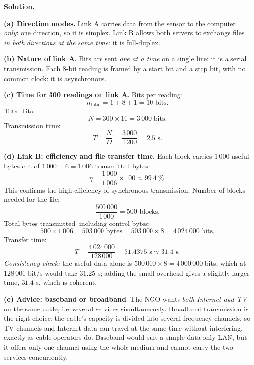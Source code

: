 \documentclass[11pt]{article}
\newcommand{\cle}[1]{{\popxbold\color{popdark}#1}}
\begin{document}
\begin{exoresolu}
\textbf{Solution.}

\textbf{(a) Direction modes.} Link A carries data from the sensor to the computer \emph{only}: one direction, so it is \cle{simplex}. Link B allows both servers to exchange files \emph{in both directions at the same time}: it is \cle{full-duplex}.

\textbf{(b) Nature of link A.} Bits are sent \emph{one at a time} on a single line: it is a \cle{serial} transmission. Each 8-bit reading is framed by a start bit and a stop bit, with no common clock: it is \cle{asynchronous}.

\textbf{(c) Time for 300 readings on link A.} Bits per reading:
\[ n_{\text{total}} = 1 + 8 + 1 = 10 \text{ bits}. \]
Total bits:
\[ N = 300 \times 10 = 3\,000 \text{ bits}. \]
Transmission time:
\[ T = \frac{N}{D} = \frac{3\,000}{1\,200} = 2.5 \text{ s}. \]

\textbf{(d) Link B: efficiency and file transfer time.} Each block carries $1\,000$ useful bytes out of $1\,000 + 6 = 1\,006$ transmitted bytes:
\[ \eta = \frac{1\,000}{1\,006} \times 100 \approx 99.4\ \%. \]
This confirms the high efficiency of synchronous transmission. Number of blocks needed for the file:
\[ \frac{500\,000}{1\,000} = 500 \text{ blocks}. \]
Total bytes transmitted, including control bytes:
\[ 500 \times 1\,006 = 503\,000 \text{ bytes} = 503\,000 \times 8 = 4\,024\,000 \text{ bits}. \]
Transfer time:
\[ T = \frac{4\,024\,000}{128\,000} = 31.4375 \text{ s} \approx 31.4 \text{ s}. \]
\emph{Consistency check:} the useful data alone is $500\,000 \times 8 = 4\,000\,000$ bits, which at $128\,000$ bit/s would take $31.25$ s; adding the small overhead gives a slightly larger time, $31.4$ s, which is coherent.

\textbf{(e) Advice: baseband or broadband.} The NGO wants \emph{both Internet and TV} on the same cable, i.e. several services simultaneously. \cle{Broadband} transmission is the right choice: the cable's capacity is divided into several frequency channels, so TV channels and Internet data can travel at the same time without interfering, exactly as cable operators do. Baseband would suit a simple data-only LAN, but it offers only one channel using the whole medium and cannot carry the two services concurrently.
\end{exoresolu}
\end{document}
